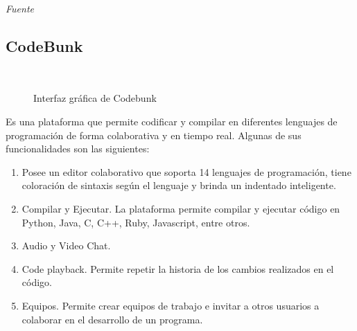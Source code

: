 \emph{Fuente} \cite{pinzas_desarrollo_2013}

\subsection{CodeBunk}
\begin{figure}[h]
  \centering
  \caption[CodeBunk]{Interfaz gráfica de Codebunk}
    \\
  \label{fig:codebunk}

\end{figure}
Es una plataforma que permite codificar y compilar en diferentes lenguajes de programación de forma colaborativa y en tiempo real. Algunas de sus funcionalidades son las siguientes:\\

\begin{enumerate}
  \item Posee un editor colaborativo que soporta 14 lenguajes de programación, tiene coloración de sintaxis según el lenguaje y brinda un indentado inteligente.
  \item Compilar y Ejecutar. La plataforma permite compilar y ejecutar código en Python, Java, C, C++, Ruby, Javascript, entre otros.
  \item Audio y Video Chat.
  \item Code playback. Permite repetir la historia de los cambios realizados en el código.
  \item Equipos. Permite crear equipos de trabajo e invitar a otros usuarios a colaborar en el desarrollo de un programa.
\end{enumerate}


\newpage
